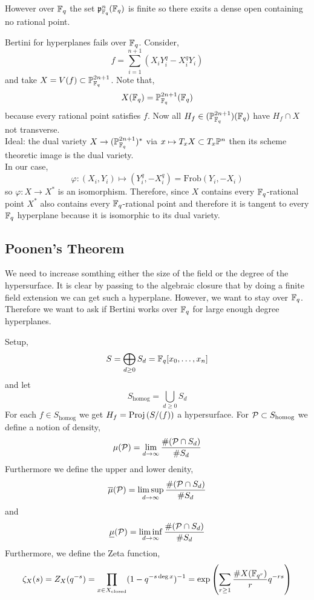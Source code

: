 \documentclass[12pt]{article}
\begin{document}
\begin{rmk}
However over $\FF_q$ the set $\p^n_{\FF_q}(\FF_q)$ is finite so there exsits a dense open containing no rational point.
\end{rmk}

\begin{example}[Katz]
Bertini for hyperplanes fails over $\FF_q$. Consider,
\[ f = \sum_{i = 1}^{n+1} (X_i Y_i^q - X_i^q Y_i) \]
and take $X = V(f) \subset \P^{2n + 1}_{\FF_q}$. Note that,
\[ X(\FF_q) = \P^{2n+1}_{\FF_q}(\FF_q) \]
because every rational point satisfies $f$. Now all $H_f \in (\P^{2n+1}_{\FF_q})(\FF_q)$ have $H_f \cap X$ not transverse. 
\bigskip\\
Ideal: the dual variety $X \to (\P_{\FF_q}^{2n+1})^*$ via $x \mapsto T_x X \subset T_x \P^n$ then its scheme theoretic image is the dual variety. 
\bigskip\\
In our case,
\[ \varphi : (X_i, Y_i) \mapsto (Y_i^q, - X_i^q) = \mathrm{Frob}(Y_i, - X_i) \]
so $\varphi : X \to X^*$ is an isomorphism. Therefore, since $X$ contains every $\FF_q$-rational point $X^*$ also contains every $\FF_q$-rational point and therefore it is tangent to every $\FF_q$ hyperplane because it is isomorphic to its dual variety. 
\end{example}

\subsection{Poonen's Theorem}

\begin{rmk}
We need to increase somthing either the size of the field or the degree of the hypersurface. It is clear by passing to the algebraic closure that by doing a finite field extension we can get such a hyperplane. However, we want to stay over $\FF_q$. Therefore we want to ask if Bertini works over $\FF_q$ for large enough degree hyperplanes.
\end{rmk}

Setup, 
\[ S = \bigoplus_{d \ge 0} S_d = \FF_q[x_0, \dots, x_n] \]
and let 
\[ S_{\text{homog}} = \bigcup_{d \ge 0} S_d \]
For each $f \in S_{\text{homog}}$ we get $H_f = \Proj{S / (f)}$ a hypersurface. For $\cP \subset S_{\text{homog}}$ we define a notion of density,
\[ \mu(\cP) = \lim_{d \to \infty} \frac{ \# (\cP \cap S_d)}{\# S_d} \]
Furthermore we define the upper and lower denity,
\[ \overline{\mu}(\cP) = \limsup_{d \to \infty} \frac{ \# (\cP \cap S_d)}{\# S_d} \]
and 
\[ \underline{\mu}(\cP) = \liminf_{d \to \infty} \frac{ \# (\cP \cap S_d)}{\# S_d} \]
Furthermore, we define the Zeta function,
\[ \zeta_X(s) = Z_X(q^{-s}) = \prod_{x \in X_{\text{closed}}} (1 - q^{-s \deg{x}})^{-1} = \exp \left( \sum_{r \ge 1} \frac{\# X(\FF_{q^r})}{r} q^{-rs} \right) \]
\end{document}
